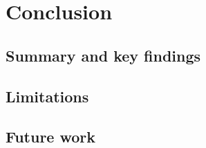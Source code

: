 %
\chapter{Conclusion}
\label{sec:conclusion}

\section{Summary and key findings}
\label{sec:conclusion:summary}

\section{Limitations}
\label{sec:conclusion:limitations}

\section{Future work}
\label{sec:conclusion:future}